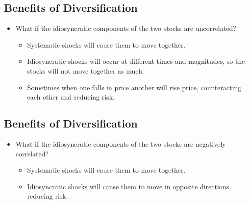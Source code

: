 \documentclass[letterpaper,10pt,english]{sphinxmanual}
\begin{document}
\subsection{Benefits of Diversification}
\label{portfolioOpt:id1}\begin{itemize}
\item {} 
What if the idiosyncratic components of the two stocks are
uncorrelated?
\begin{itemize}
\item {} 
Systematic shocks will cause them to move together.

\end{itemize}
\begin{itemize}
\item {} 
Idiosyncratic shocks will occur at different times and magnitudes,
so the stocks will not move together as much.

\end{itemize}
\begin{itemize}
\item {} 
Sometimes when one falls in price another will rise price,
counteracting each other and reducing risk.

\end{itemize}

\end{itemize}


\subsection{Benefits of Diversification}
\label{portfolioOpt:id2}\begin{itemize}
\item {} 
What if the idiosyncratic components of the two stocks are
negatively correlated?
\begin{itemize}
\item {} 
Systematic shocks will cause them to move together.

\end{itemize}
\begin{itemize}
\item {} 
Idiosyncratic shocks will cause them to move in opposite
directions, reducing risk.

\end{itemize}

\end{itemize}
\end{document}
